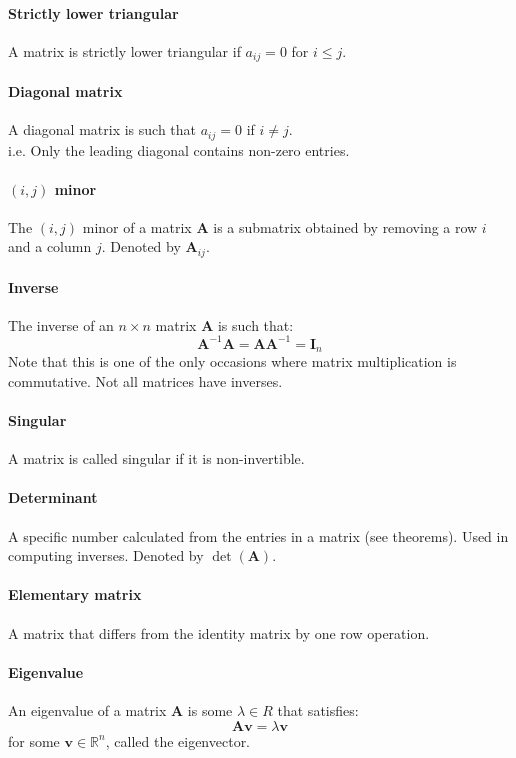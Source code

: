 \documentclass{scrartcl}
\newcommand{\R}{\mathbb{R}}
\renewcommand{\vec}[1]{\mathbf{#1}}
\begin{document}
\paragraph{Strictly lower triangular}
A matrix is strictly lower triangular if $ a_{ij} = 0 $ for $ i \leq j $.

\paragraph{Diagonal matrix}
A diagonal matrix is such that $ a_{ij} = 0 $ if $ i \neq j $.
\\
i.e. Only the leading diagonal contains non-zero entries.

\paragraph{$ (i, j) $ minor}
The $ (i, j) $ minor of a matrix $ \vec{A} $ is a submatrix obtained by removing a row $ i $ and a column $ j $. Denoted by $ \vec{A}_{ij} $.

\paragraph{Inverse}
The inverse of an $ n \times n $ matrix $ \vec{A} $ is such that:
\begin{equation}
\vec{A}^{-1} \vec{A} = \vec{A} \vec{A}^{-1} = \vec{I}_{n}
\end{equation}
Note that this is one of the only occasions where matrix multiplication is commutative. Not all matrices have inverses.

\paragraph{Singular}
A matrix is called singular if it is non-invertible.

\paragraph{Determinant}
A specific number calculated from the entries in a matrix (see theorems). Used in computing inverses. Denoted by $ \det(\vec{A}) $.

\paragraph{Elementary matrix}
A matrix that differs from the identity matrix by one row operation.

\paragraph{Eigenvalue}
An eigenvalue of a matrix $ \vec{A} $ is some $ \lambda \in R $ that satisfies:
\begin{equation}
\vec{A} \vec{v} = \lambda \vec{v}
\end{equation}
for some $ \vec{v} \in \R^{n} $, called the eigenvector.
\end{document}
